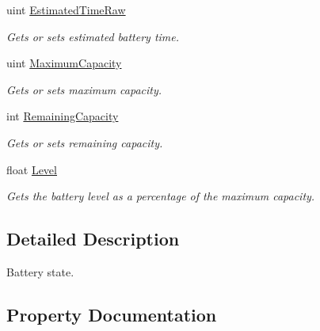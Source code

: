 \begin{DoxyCompactItemize}
uint \hyperlink{class_microsoft_1_1_tools_1_1_windows_device_portal_1_1_device_portal_1_1_battery_state_a91e8fe33c791e7ad58cc234d9cd5d935}{Estimated\+Time\+Raw}
\begin{DoxyCompactList}\small\item\em Gets or sets estimated battery time. \end{DoxyCompactList}\item 
uint \hyperlink{class_microsoft_1_1_tools_1_1_windows_device_portal_1_1_device_portal_1_1_battery_state_a270a4beca6e1d5046707581bbbdb6777}{Maximum\+Capacity}
\begin{DoxyCompactList}\small\item\em Gets or sets maximum capacity. \end{DoxyCompactList}\item 
int \hyperlink{class_microsoft_1_1_tools_1_1_windows_device_portal_1_1_device_portal_1_1_battery_state_adad259b4fae1543afc538b98e8302ab8}{Remaining\+Capacity}
\begin{DoxyCompactList}\small\item\em Gets or sets remaining capacity. \end{DoxyCompactList}\item 
float \hyperlink{class_microsoft_1_1_tools_1_1_windows_device_portal_1_1_device_portal_1_1_battery_state_a8f5b46ac830b139f0549cc144f9ba499}{Level}
\begin{DoxyCompactList}\small\item\em Gets the battery level as a percentage of the maximum capacity. \end{DoxyCompactList}\end{DoxyCompactItemize}


\subsection{Detailed Description}
Battery state. 



\subsection{Property Documentation}
